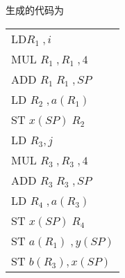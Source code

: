 \documentclass[a4paper, 16pt]{article}
\begin{document}
生成的代码为
\begin{table}[H]
\centering
\begin{tabular}{l}
LD$R_1\;, i$\\
MUL $R_1\;, R_1\;, 4$\\
ADD $R_1\;R_1\;, SP$\\
LD $R_2\;, a(R_1)$\\
ST $x(SP)\;R_2$\\
LD $R_3, j$\\
MUL $R_3\;, R_3\;, 4$\\
ADD $R_3\;R_3\;, SP$\\
LD $R_4\;, a(R_3)$\\
ST $x(SP)\;R_4$\\
ST $a(R_1)\;, y(SP)$\\
ST $b(R_3), x(SP)$\\
\end{tabular}
\end{table}
\end{document}
